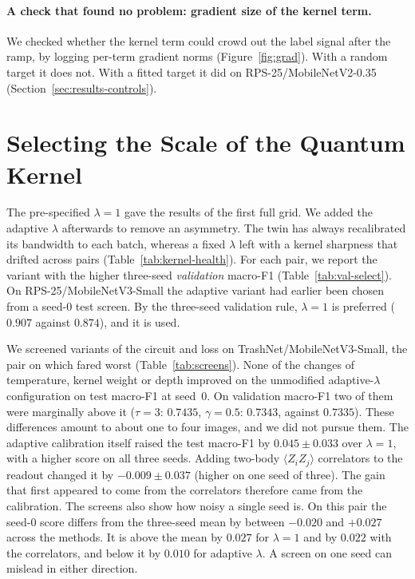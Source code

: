 \paragraph{A check that found no problem: gradient size of the kernel term.}
We checked whether the kernel term could crowd out the label signal after the ramp, by logging per-term gradient norms (Figure~\ref{fig:grad}). With a random target it does not. With a fitted target it did on RPS-25/MobileNetV2-0.35 (Section~\ref{sec:results-controls}).

\section{Selecting the Scale of the Quantum Kernel}
\label{app:screens}

The pre-specified $\lambda=1$ gave the \Pqk results of the first full grid.
We added the adaptive $\lambda$ afterwards to remove an asymmetry. The twin has always recalibrated its bandwidth to each batch, whereas a fixed $\lambda$ left \Pqk with a kernel sharpness that drifted across pairs (Table~\ref{tab:kernel-health}).
For each pair, we report the variant with the higher three-seed \emph{validation} macro-F1 (Table~\ref{tab:val-select}).
On RPS-25/MobileNetV3-Small the adaptive variant had earlier been chosen from a seed-0 test screen. By the three-seed validation rule, $\lambda=1$ is preferred ($0.907$ against $0.874$), and it is used.

\begin{table}[t]
  \centering
  \caption{Validation macro-F1 of the two $\lambda$ calibrations of \Pqk (mean $\pm$ std over three seeds) and the one selected. Adaptive $\lambda$ has one seed on the LeNet-5 pairs and is not eligible there.}
  \label{tab:val-select}
\end{table}

We screened variants of the circuit and loss on TrashNet/MobileNetV3-Small, the pair on which \Pqk fared worst (Table~\ref{tab:screens}).
None of the changes of temperature, kernel weight or depth improved on the unmodified adaptive-$\lambda$ configuration on test macro-F1 at seed~0. On validation macro-F1 two of them were marginally above it ($\tau=3$: $0.7435$, $\gamma=0.5$: $0.7343$, against $0.7335$). These differences amount to about one to four images, and we did not pursue them.
The adaptive calibration itself raised the test macro-F1 by $0.045\pm0.033$ over $\lambda=1$, with a higher score on all three seeds. Adding two-body $\langle Z_iZ_j\rangle$ correlators to the readout changed it by $-0.009\pm0.037$ (higher on one seed of three). The gain that first appeared to come from the correlators therefore came from the calibration.
The screens also show how noisy a single seed is. On this pair the seed-0 score differs from the three-seed mean by between $-0.020$ and $+0.027$ across the methods. It is above the mean by $0.027$ for $\lambda=1$ and by $0.022$ with the correlators, and below it by $0.010$ for adaptive $\lambda$. A screen on one seed can mislead in either direction.

